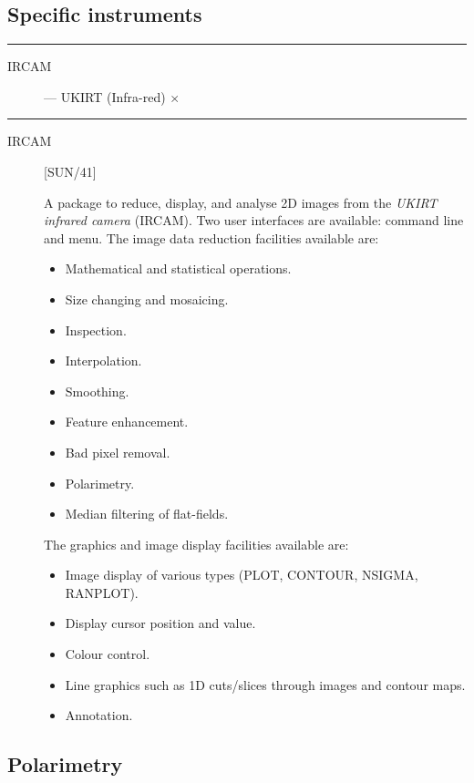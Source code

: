 \subsection{Specific instruments}

\rule{\textwidth}{0.5mm}
\begin{description}
\begin{description}
\item [IRCAM] --- UKIRT (Infra-red) \hfill $\times$
\end{description}
\end{description}
\rule{\textwidth}{0.5mm}

\begin{description}

\item [IRCAM] \hfill [SUN/41]

A package to reduce, display, and analyse 2D images from the
{\em UKIRT infrared camera} (IRCAM).
Two user interfaces are available: command line and menu.
The image data reduction facilities available are:
\begin{itemize}
\item Mathematical and statistical operations.
\item Size changing and mosaicing.
\item Inspection.
\item Interpolation.
\item Smoothing.
\item Feature enhancement.
\item Bad pixel removal.
\item Polarimetry.
\item Median filtering of flat-fields.
\end{itemize}
The graphics and image display facilities available are:
\begin{itemize}
\item Image display of various types (PLOT, CONTOUR, NSIGMA, RANPLOT).
\item Display cursor position and value.
\item Colour control.
\item Line graphics such as 1D cuts/slices through images and contour maps.
\item Annotation.
\end{itemize}

\end{description}

\newpage

\subsection{Polarimetry}

